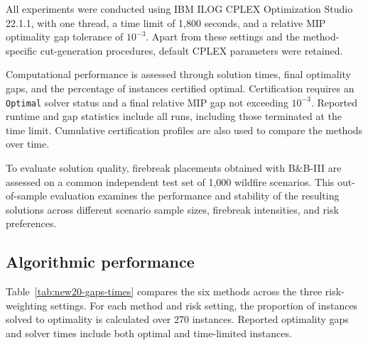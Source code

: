 \documentclass[a4paper,fleqn]{cas-sc}
\begin{document}
All experiments were conducted using IBM ILOG CPLEX Optimization
Studio 22.1.1, with one thread, a time limit of 1,800 seconds, and
a relative MIP optimality gap tolerance of $10^{-3}$. Apart from these settings and the method-specific cut-generation procedures, default CPLEX parameters were retained.

Computational performance is assessed through solution times,
final optimality gaps, and the percentage of instances certified
optimal. Certification requires an \texttt{Optimal} solver status
and a final relative MIP gap not exceeding $10^{-3}$.
Reported runtime and gap statistics include all runs, including
those terminated at the time limit. Cumulative certification profiles are also used to compare the methods over time.

To evaluate solution quality, firebreak placements obtained with
B\&B-III are assessed on a common independent test set of 1,000
wildfire scenarios. This out-of-sample evaluation examines the
performance and stability of the resulting solutions across
different scenario sample sizes, firebreak intensities, and
risk preferences.


\subsection{Algorithmic performance}\label{sec:results}

Table~\ref{tab:new20-gaps-times} compares the six methods across the three risk-weighting settings. For each method and risk setting, the proportion of instances solved to optimality is calculated over 270 instances. Reported optimality gaps and solver times include both optimal and time-limited instances. 
\end{document}
